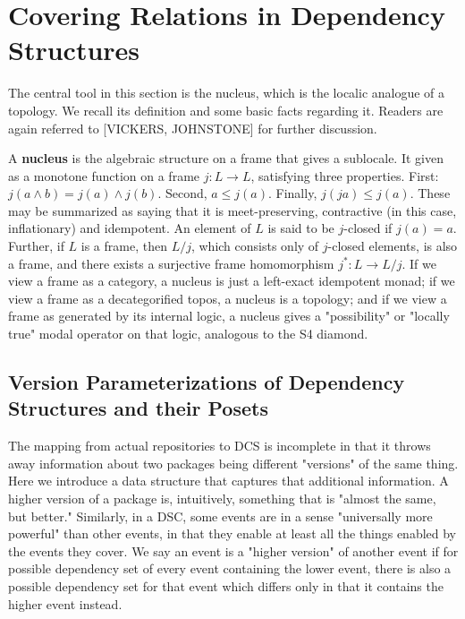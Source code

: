 \documentclass[hoptionsi,review,format=acmsmall]{acmart}
\theoremstyle{definition}
\begin{document}


\section{Covering Relations in Dependency Structures}

The central tool in this section is the nucleus, which is the localic analogue of a topology. We recall its definition and some basic facts regarding it. Readers are again referred to [VICKERS, JOHNSTONE] for further discussion.

A \textbf{nucleus} is the algebraic structure on a frame that gives a sublocale. It given as a monotone function on a frame \(j : L \rightarrow L\), satisfying three properties. First: \(j(a \wedge b) = j(a) \wedge j(b)\). Second, \(a \le j(a)\). Finally, \(j(ja) \le j(a)\). These may be summarized as saying that it is meet-preserving, contractive (in this case, inflationary) and idempotent. An element of \(L\) is said to be \(j\)-closed if \(j(a)=a\). Further, if \(L\) is a frame, then \(L/j\), which consists only of \(j\)-closed elements, is also a frame, and there exists a surjective frame homomorphism \(j^* : L \rightarrow L/j\). If we view a frame as a category, a nucleus is just a left-exact idempotent monad; if we view a frame as a decategorified topos, a nucleus is a topology; and if we view a frame as generated by its internal logic, a nucleus gives a "possibility" or "locally true" modal operator on that logic, analogous to the S4 diamond.

\subsection{Version Parameterizations of Dependency Structures and their Posets}

The mapping from actual repositories to DCS is incomplete in that it throws away information about two packages being different "versions" of the same thing. Here we introduce a data structure that captures that additional information. A higher version of a package is, intuitively, something that is "almost the same, but better." Similarly, in a DSC, some events are in a sense "universally more powerful" than other events, in that they enable at least all the things enabled by the events they cover. We say an event is a "higher version" of another event if for possible dependency set of every event containing the lower event, there is also a possible dependency set for that event which differs only in that it contains the higher event instead.
\end{document}
